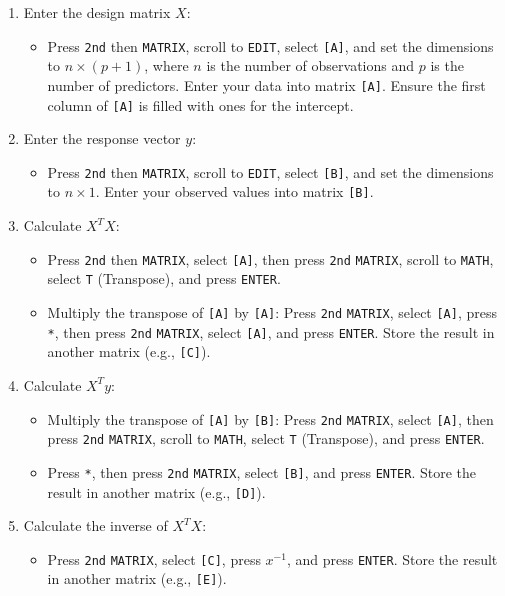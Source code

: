\documentclass{article}
\newcommand{\code}[1]{\colorbox{light-gray}{\texttt{#1}}}
\begin{document}
\begin{enumerate}
    \item Enter the design matrix $X$:
    \begin{itemize}
        \item Press \code{2nd} then \code{MATRIX}, scroll to \code{EDIT}, select \code{[A]}, and set the dimensions to $n \times (p+1)$, where $n$ is the number of observations and $p$ is the number of predictors. Enter your data into matrix \code{[A]}. Ensure the first column of \code{[A]} is filled with ones for the intercept.
    \end{itemize}
    \item Enter the response vector $y$:
    \begin{itemize}
        \item Press \code{2nd} then \code{MATRIX}, scroll to \code{EDIT}, select \code{[B]}, and set the dimensions to $n \times 1$. Enter your observed values into matrix \code{[B]}.
    \end{itemize}
    \item Calculate $X^T X$:
    \begin{itemize}
        \item Press \code{2nd} then \code{MATRIX}, select \code{[A]}, then press \code{2nd} \code{MATRIX}, scroll to \code{MATH}, select \code{T} (Transpose), and press \code{ENTER}.
        \item Multiply the transpose of \code{[A]} by \code{[A]}: Press \code{2nd} \code{MATRIX}, select \code{[A]}, press \code{*}, then press \code{2nd} \code{MATRIX}, select \code{[A]}, and press \code{ENTER}. Store the result in another matrix (e.g., \code{[C]}).
    \end{itemize}
    \item Calculate $X^T y$:
    \begin{itemize}
        \item Multiply the transpose of \code{[A]} by \code{[B]}: Press \code{2nd} \code{MATRIX}, select \code{[A]}, then press \code{2nd} \code{MATRIX}, scroll to \code{MATH}, select \code{T} (Transpose), and press \code{ENTER}.
        \item Press \code{*}, then press \code{2nd} \code{MATRIX}, select \code{[B]}, and press \code{ENTER}. Store the result in another matrix (e.g., \code{[D]}).
    \end{itemize}
    \item Calculate the inverse of $X^T X$:
    \begin{itemize}
        \item Press \code{2nd} \code{MATRIX}, select \code{[C]}, press \code{$x^{-1}$}, and press \code{ENTER}. Store the result in another matrix (e.g., \code{[E]}).

\end{itemize}
\end{enumerate}
\end{document}
